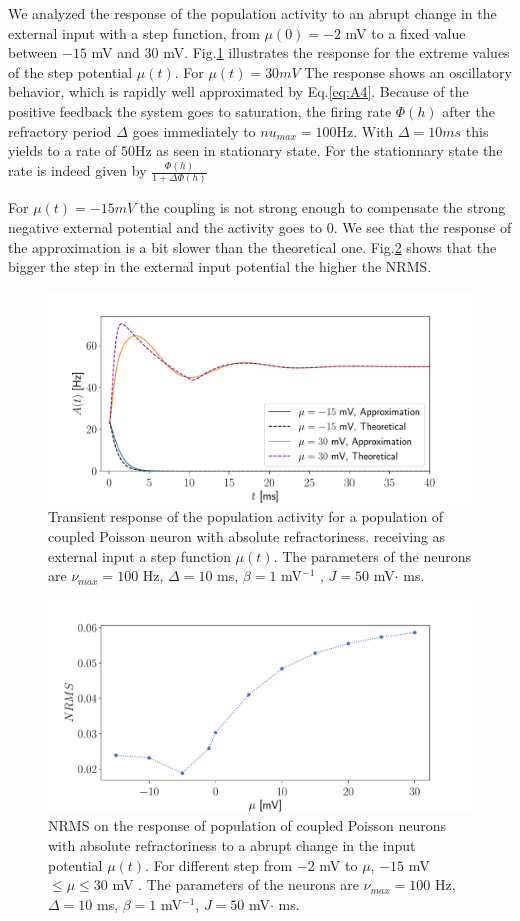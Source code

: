 \documentclass[12pt,twoside]{report}
\begin{document}
We analyzed the response of the population activity to an abrupt change in the external input with a step function, from $\mu(0)=-2$ mV to a fixed value between $-15$ mV and $30$ mV. Fig.\ref{fig:Astep_coupled}  illustrates the response for the extreme values of the step potential $\mu(t)$. For $\mu(t)=30mV$ The response shows an oscillatory behavior, which is rapidly well approximated by Eq.\ref{eq:A4}.  Because of the positive feedback the system goes to saturation, 
the firing rate $\Phi(h)$ after the refractory period $\Delta$ goes immediately to $nu_{max}=100$Hz. With $\Delta=10ms$ this yields to a rate of $50$Hz as seen in stationary state. For the stationnary state the rate is indeed given by $\frac{\Phi(h)}{1+\Delta \Phi(h)}$


 For $\mu(t)=-15mV$ the coupling is not strong enough to compensate the strong negative external potential and the activity goes to $0$. We see that the response of the approximation is a bit slower than the theoretical one. Fig.\ref{fig:NRMSstep_coupled} shows that the bigger the step in the external input potential the higher the NRMS.


\begin{figure}[h!]
	\centering
	\includegraphics[width=0.8\linewidth]{Astep_coupled.pdf}
	\caption{Transient response of the population activity for a population of coupled Poisson neuron with absolute refractoriness. receiving as external input a step function $\mu(t)$. The parameters of the neurons are $\nu_{max}=100$ Hz, $\Delta=10$ ms, $\beta=1$ mV$^{-1}$ , $J=50$ mV$\cdot$ ms.
	}
	\label{fig:Astep_coupled}
\end{figure}

\begin{figure}[h!]
	\centering
	\includegraphics[width=0.8\linewidth]{NRMSstep_coupled.pdf}
	\caption{NRMS on the response of population of coupled Poisson neurons with absolute refractoriness to a abrupt change in the input potential $\mu(t)$. For different step from $-2$ mV to $\mu$,  $-15$ mV$\leq\mu\leq30$ mV . The parameters of the neurons are $\nu_{max}=100$ Hz, $\Delta=10$ ms, $\beta=1$ mV$^{-1}$, $J=50$ mV$\cdot$ ms.
	}
	\label{fig:NRMSstep_coupled}
\end{figure}
\end{document}
